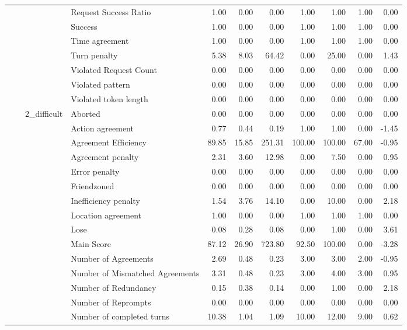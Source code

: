 \begin{tabular}{llllrrrrrrr}
 &  &  & Request Success Ratio & 1.00 & 0.00 & 0.00 & 1.00 & 1.00 & 1.00 & 0.00 \\
 &  &  & Success & 1.00 & 0.00 & 0.00 & 1.00 & 1.00 & 1.00 & 0.00 \\
 &  &  & Time agreement & 1.00 & 0.00 & 0.00 & 1.00 & 1.00 & 1.00 & 0.00 \\
 &  &  & Turn penalty & 5.38 & 8.03 & 64.42 & 0.00 & 25.00 & 0.00 & 1.43 \\
 &  &  & Violated Request Count & 0.00 & 0.00 & 0.00 & 0.00 & 0.00 & 0.00 & 0.00 \\
 &  &  & Violated pattern & 0.00 & 0.00 & 0.00 & 0.00 & 0.00 & 0.00 & 0.00 \\
 &  &  & Violated token length & 0.00 & 0.00 & 0.00 & 0.00 & 0.00 & 0.00 & 0.00 \\
\cline{3-11}
 &  & \multirow[t]{27}{*}{2_difficult} & Aborted & 0.00 & 0.00 & 0.00 & 0.00 & 0.00 & 0.00 & 0.00 \\
 &  &  & Action agreement & 0.77 & 0.44 & 0.19 & 1.00 & 1.00 & 0.00 & -1.45 \\
 &  &  & Agreement Efficiency & 89.85 & 15.85 & 251.31 & 100.00 & 100.00 & 67.00 & -0.95 \\
 &  &  & Agreement penalty & 2.31 & 3.60 & 12.98 & 0.00 & 7.50 & 0.00 & 0.95 \\
 &  &  & Error penalty & 0.00 & 0.00 & 0.00 & 0.00 & 0.00 & 0.00 & 0.00 \\
 &  &  & Friendzoned & 0.00 & 0.00 & 0.00 & 0.00 & 0.00 & 0.00 & 0.00 \\
 &  &  & Inefficiency penalty & 1.54 & 3.76 & 14.10 & 0.00 & 10.00 & 0.00 & 2.18 \\
 &  &  & Location agreement & 1.00 & 0.00 & 0.00 & 1.00 & 1.00 & 1.00 & 0.00 \\
 &  &  & Lose & 0.08 & 0.28 & 0.08 & 0.00 & 1.00 & 0.00 & 3.61 \\
 &  &  & Main Score & 87.12 & 26.90 & 723.80 & 92.50 & 100.00 & 0.00 & -3.28 \\
 &  &  & Number of Agreements & 2.69 & 0.48 & 0.23 & 3.00 & 3.00 & 2.00 & -0.95 \\
 &  &  & Number of Mismatched Agreements & 3.31 & 0.48 & 0.23 & 3.00 & 4.00 & 3.00 & 0.95 \\
 &  &  & Number of Redundancy & 0.15 & 0.38 & 0.14 & 0.00 & 1.00 & 0.00 & 2.18 \\
 &  &  & Number of Reprompts & 0.00 & 0.00 & 0.00 & 0.00 & 0.00 & 0.00 & 0.00 \\
 &  &  & Number of completed turns & 10.38 & 1.04 & 1.09 & 10.00 & 12.00 & 9.00 & 0.62 \\

\end{tabular}
